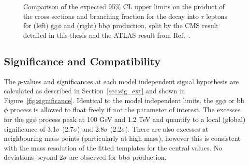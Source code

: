 \begin{figure}[!hbtp]
\centering
\caption{Comparison of the expected 95\% CL upper limits on the product of the cross sections and branching fraction for the decay into $\tau$ leptons for (left) gg$\phi$ and (right) bb$\phi$ production, split by the CMS result detailed in this thesis and the ATLAS result from Ref.~\cite{ATLAS:2020zms}.}
\label{fig:model_independent_limits_ATLAS}
\end{figure}

\subsection{Significance and Compatibility}

The $p$-values and significances at each model independent signal hypothesis are calculated as described in Section~\ref{sec:sig_ext} and shown in Figure~\ref{fig:significance}.
Identical to the model independent limits, the gg$\phi$ or bb$\phi$ process is allowed to float freely if not the parameter of interest.
The excesses for the gg$\phi$ process peak at 100 GeV and 1.2 TeV and quantify to a local (global) significance of 3.1$\sigma$ (2.7$\sigma$) and 2.8$\sigma$ (2.2$\sigma$).
There are also excesses at neighbouring mass points (particularly at high mass), however this is consistent with the mass resolution of the fitted templates for the central values.
No deviations beyond 2$\sigma$ are observed for bb$\phi$ production.


